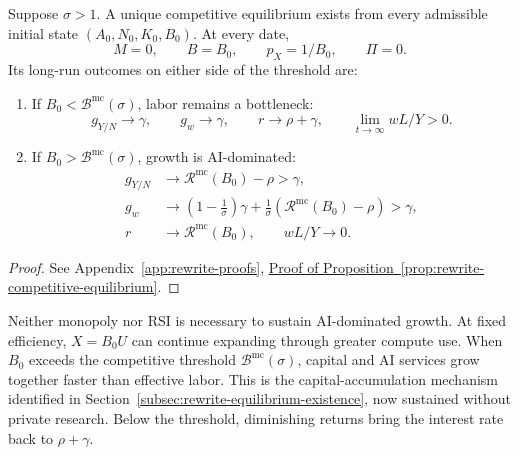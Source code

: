 \begin{proposition}
\label{prop:rewrite-competitive-equilibrium}
Suppose $\sigma>1$.
A unique competitive equilibrium exists from every admissible initial
state $(A_0,N_0,K_0,B_0)$. At every date,
\begin{equation}
 M=0,\qquad B=B_0,\qquad p_{X}=1/B_0,\qquad \Pi=0.
 \label{eq:rewrite-competitive-no-research}
\end{equation}
Its long-run outcomes on either side of the threshold are:
\begin{enumerate}[label=(\roman*),leftmargin=*,itemsep=0.5em]
\item If $B_0<\mathcal B^{\mathrm{mc}}(\sigma)$, labor remains a bottleneck:
\[
 g_{Y/N}\to\gamma,\qquad g_w\to\gamma,\qquad
 r\to\rho+\gamma,\qquad \lim_{t\to\infty}wL/Y>0.
\]
\item If $B_0>\mathcal B^{\mathrm{mc}}(\sigma)$, growth is AI-dominated:
\begin{equation}
 \begin{aligned}
 g_{Y/N}&\to\mathcal R^{\mathrm{mc}}(B_0)-\rho>\gamma,\\
 g_w&\to\left(1-\frac1\sigma\right)\gamma
 +\frac1\sigma\left(\mathcal R^{\mathrm{mc}}(B_0)-\rho\right)>\gamma,\\
 r&\to\mathcal R^{\mathrm{mc}}(B_0),\qquad wL/Y\to0.
 \end{aligned}
 \label{eq:rewrite-competitive-ai-growth}
\end{equation}
\end{enumerate}
\end{proposition}
\begin{proof}
See Appendix~\ref{app:rewrite-proofs},
\hyperref[proof:rewrite-competitive-equilibrium]{Proof of
Proposition~\ref*{prop:rewrite-competitive-equilibrium}}.
\end{proof}

Neither monopoly nor RSI is necessary to sustain AI-dominated growth. At fixed
efficiency, $X=B_0U$ can continue expanding through greater compute use.
When $B_0$ exceeds the competitive threshold
$\mathcal B^{\mathrm{mc}}(\sigma)$, capital and AI services
grow together faster than effective labor. This is the capital-accumulation
mechanism identified in Section~\ref{subsec:rewrite-equilibrium-existence},
now sustained without private research. Below the threshold, diminishing
returns bring the interest rate back to $\rho+\gamma$. %

